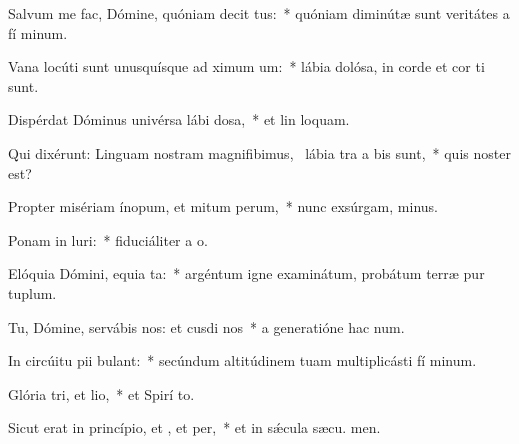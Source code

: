 \item Salvum me fac, Dómine, quóniam decit tus:~* quóniam diminútæ sunt veritátes a fí minum.
\item Vana locúti sunt unusquísque ad ximum um:~* lábia dolósa, in corde et cor ti sunt.
\item Dispérdat Dóminus univérsa lábi dosa,~* et lin loquam.
\item Qui dixérunt: Linguam nostram magnifibimus,~\pscross{} lábia tra a bis sunt,~* quis noster  est?
\item Propter misériam ínopum, et mitum perum,~* nunc exsúrgam,  minus.
\item Ponam in luri:~* fiduciáliter a  o.
\item Elóquia Dómini, equia ta:~* argéntum igne examinátum, probátum terræ pur tuplum.
\item Tu, Dómine, servábis nos: et cusdi nos~* a generatióne hac  num.
\item In circúitu pii bulant:~* secúndum altitúdinem tuam multiplicásti fí minum.
\item Glória tri, et lio,~* et Spirí to.
\item Sicut erat in princípio, et , et per,~* et in sǽcula sæcu. men.
